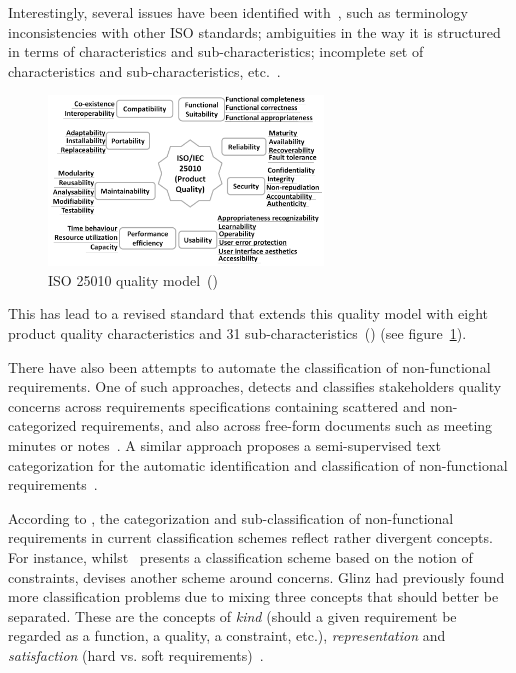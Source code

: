 \documentclass[dissertation,final]{softeng}
\begin{document}
Interestingly, several issues have been identified with~, such as terminology inconsistencies with other ISO standards; ambiguities in the way it is structured in terms of characteristics and sub-characteristics; incomplete set of characteristics and sub-characteristics, etc.~\citep{Al-Qutaish}.

\begin{figure}[h]
\includegraphics[width=0.65\textwidth]{iso25010}
\centering
\caption[ISO 25010 quality model]{ISO 25010 quality model~()}
\label{fig:iso25010}
\end{figure}

This has lead to a revised standard that extends this quality model with eight product quality characteristics and 31 sub-characteristics~() (see figure~\ref{fig:iso25010}).

There have also been attempts to automate the classification of non-functional requirements. One of such approaches, detects and classifies stakeholders quality concerns across requirements specifications containing scattered and non-categorized requirements, and also across free-form documents such as meeting minutes or notes~\citep{Cleland-Huang:2007}. A similar approach proposes a semi-supervised text categorization for the automatic identification and classification of non-functional requirements~\citep{Casamayor:2010}.

According to \citet{Glinz:2007ehba}, the categorization and sub-classification of non-functional requirements in current classification schemes reflect rather divergent concepts. For instance, whilst~\citet{Roman:1985} presents a classification scheme based on the notion of constraints, \citet{adams2015non} devises another scheme around concerns. Glinz had previously found more classification problems due to mixing three concepts that should better be separated. These are the concepts of \emph{kind} (should a given requirement be regarded as a function, a quality, a constraint, etc.), \emph{representation} and \emph{satisfaction} (hard vs. soft requirements)~\citep{Glinz:2005unba}.
\end{document}
